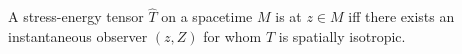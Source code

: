 A stress-energy tensor $\hat{T}$ on a spacetime $M$ is  at $z \in M$ iff there exists an instantaneous observer $(z, Z)$ for whom $\hat{T}$ is spatially isotropic.
